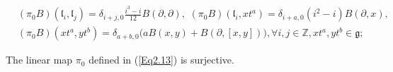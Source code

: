 \documentclass[10pt,a4paper]{amsart}
\def\bZ{\mathbb{Z}}
\def\fg{\mathfrak{g}}
\def\fl{\mathfrak{l}}
\begin{document}
\begin{equation}\label{Eq2.13}\begin{aligned}&(\pi_0B)(\fl_i,\fl_j)=\delta_{i+j,0}\frac{i^3-i}{12} B(\partial,\partial),\,\,(\pi_0 B)(\fl_i,xt^a)=\delta_{i+a,0}(i^2-i) B(\partial,x),\\ &(\pi_0B)(xt^a,yt^b)=\delta_{a+b,0}\big(aB(x,y)+B(\partial,[x,y])\big),\forall i,j\in \bZ, xt^a,yt^b\in \fg;\end{aligned}\end{equation}

 \begin{lemm}\label{lemm-10}The linear map  $\pi_0$  defined in (\ref{Eq2.13}) is surjective.\end{lemm}%
\end{document}

